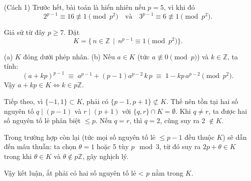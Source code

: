 \documentclass[../05-modular-arithmetic-a.tex]{subfiles}
\begin{document}
\begin{soln}(Cách 1)\footnotemark
	Trước hết, bài toán là hiển nhiên nếu \( p = 5 \), vì khi đó
	\[
		2^{p-1} \equiv 16 \not\equiv 1 \pmod{p^2}
		\quad\text{và}\quad
		3^{p-1} \equiv 6 \not\equiv 1 \pmod{p^2}.
	\]  
	
	Giả sử từ đây \( p \geq 7 \). Đặt 
	\[
		K = \{\,n\in \mathbb{Z}\,\mid\,n^{p-1}\equiv 1 \pmod{p^2}\}.
	\]
	
	(a) \(K\) đóng dưới phép nhân.  
	(b) Nếu \(a\in K\) (tức \(a\not\equiv0\pmod{p}\)) và \(k\in\mathbb{Z}\), ta tính:
	\[
		(a + kp)^{p-1} \;\equiv\; a^{p-1} + (p-1)a^{p-2}\,k\,p \;\equiv\;1 - kp\,a^{p-2}\pmod{p^2}.
	\]
	Vậy \(a+kp\in K\iff k\in p\mathbb{Z}\).  

	Tiếp theo, vì \(\{-1,1\}\subset K\), phải có \(\{p-1,p+1\}\not\subset K\).
	Thế nên tồn tại hai số nguyên tố \(q \mid (p-1)\) và \(r \mid (p+1)\) với \(\{q,r\}\cap K=\emptyset\).
	Khi \(q\ne r\), ta được hai số nguyên tố lẻ phân biệt \(\le p\). Nếu \(q=r\), thì \(q=2\), cũng suy ra 2 \(\notin K\).  

	Trong trường hợp còn lại (tức mọi số nguyên tố lẻ \(\le p-1\) đều thuộc \(K\)) sẽ dẫn đến mâu thuẫn:
	ta chọn \(\theta=1\) hoặc 5 tùy \(p\mod3\), từ đó suy ra \(2p+\theta\in K\) trong khi \(\theta\in K\) và \(\theta\notin p\mathbb{Z}\), gây nghịch lý.  

	Vậy kết luận, ắt phải có hai số nguyên tố lẻ < \(p\) nằm trong \(K\).  
\end{soln}

\end{document}
